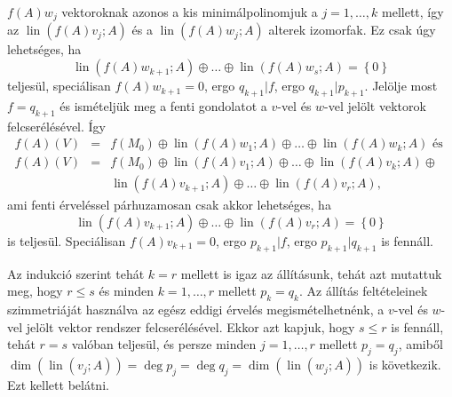 \documentclass[a4paper, showtrims]{memoir}
\makeatletter
\renewenvironment{proof}[1][\proofname]
    {\par\pushQED{\qed}%
    \normalfont \topsep6\p@\@plus6\p@\relax
    \trivlist
    \item[\hskip\labelsep
        \itshape
    #1\@addpunct{:}]\ignorespaces}
    {\popQED\endtrivlist\@endpefalse}
\theoremstyle{plain}
\theoremstyle{remark}
\theoremstyle{definition}
\DeclareMathOperator{\lin}{lin}
\makeatother
\begin{document}
\begin{proof}
    $f\left( A \right)w_j$ vektoroknak azonos a kis minimálpolinomjuk a $j=1,\ldots,k$ mellett,
    így az 
    $\lin\left( f\left( A \right)v_j;A \right)$ és a 
    $\lin\left( f\left( A \right)w_j;A \right)$ alterek izomorfak.
    Ez csak úgy lehetséges, ha
    \[
        \lin\left( f\left( A \right)w_{k+1};A \right)
        \oplus\ldots\oplus
        \lin\left( f\left( A \right)w_s;A \right)
        =
        \left\{ 0 \right\}
    \]
    teljesül,
    speciálisan $f\left( A \right)w_{k+1}=0$, ergo $q_{k+1}|f$, ergo $q_{k+1}|p_{k+1}$.
    Jelölje most $f=q_{k+1}$ és ismételjük meg a fenti gondolatot a $v$-vel és $w$-vel jelölt vektorok felcserélésével.
    Így
    \begin{eqnarray*}
        f\left( A \right)(V)
        &=& 
        f\left( M_0 \right)
        \oplus
        \lin\left( f\left( A \right)w_1;A \right)
        \oplus\ldots\oplus
        \lin\left( f\left( A \right)w_k;A \right)
        \text{ és }
        \\
        f\left( A \right)(V)
        &=& 
        f\left( M_0 \right)
        \oplus
        \lin\left( f\left( A \right)v_1;A \right)
        \oplus\ldots\oplus
        \lin\left( f\left( A \right)v_k;A \right)
        \oplus
        \\
        &&
        \lin\left( f\left( A \right)v_{k+1};A \right)
        \oplus\ldots\oplus
        \lin\left( f\left( A \right)v_r;A \right),
    \end{eqnarray*}
    ami fenti érveléssel párhuzamosan csak akkor lehetséges, 
    ha
    \[
        \lin\left( f\left( A \right)v_{k+1};A \right)
        \oplus\ldots\oplus
        \lin\left( f\left( A \right)v_r;A \right)
        =
        \left\{ 0 \right\}
    \]
    is teljesül.
    Speciálisan $f\left( A \right)v_{k+1}=0$, ergo $p_{k+1}|f$, ergo $p_{k+1}|q_{k+1}$ is fennáll.

    Az indukció szerint tehát $k=r$ mellett is igaz az állításunk,
    tehát azt mutattuk meg, hogy $r\leq s$ és minden $k=1,\ldots,r$ mellett $p_k=q_k$.
    Az állítás feltételeinek szimmetriáját használva az egész eddigi érvelés megismételhetnénk, 
    a $v$-vel és $w$-vel jelölt vektor rendszer felcserélésével.
    Ekkor azt kapjuk, hogy $s\leq r$ is fennáll, tehát $r=s$ valóban teljesül, 
    és persze minden $j=1,\ldots,r$ mellett $p_j=q_j$,
    amiből 
    $
    \dim\left( \lin\left( v_j;A \right) \right)
    =
    \deg p_j
    =
    \deg q_j
    =
    \dim\left( \lin\left( w_j;A \right) \right)
    $
    is következik.
    Ezt kellett belátni. 
\end{proof}
\end{document}
